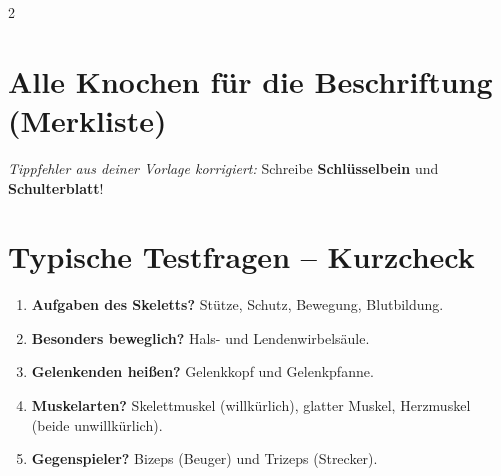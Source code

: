 \documentclass[12pt,a4paper]{article}
\begin{document}
\begin{multicols}{2}
		\section*{Alle Knochen für die Beschriftung (Merkliste)}
		\noindent \textit{Tippfehler aus deiner Vorlage korrigiert:} Schreibe \textbf{Schlüsselbein} und \textbf{Schulterblatt}!
		
		\begin{center}
		\end{center}
		
		\section*{Typische Testfragen -- Kurzcheck}
		\begin{enumerate}[noitemsep]
			\item \textbf{Aufgaben des Skeletts?} Stütze, Schutz, Bewegung, Blutbildung.
			\item \textbf{Besonders beweglich?} Hals- und Lendenwirbelsäule.
			\item \textbf{Gelenkenden heißen?} Gelenkkopf und Gelenkpfanne.
			\item \textbf{Muskelarten?} Skelettmuskel (willkürlich), glatter Muskel, Herzmuskel (beide unwillkürlich).
			\item \textbf{Gegenspieler?} Bizeps (Beuger) und Trizeps (Strecker).
		\end{enumerate}
		
	\end{multicols}
\end{document}
